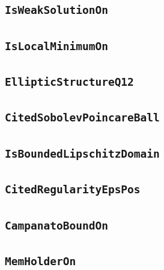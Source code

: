 \documentclass[11pt]{amsart}
\theoremstyle{definition}
\begin{document}
\subsection{\texorpdfstring{\texttt{IsWeakSolutionOn}}{IsWeakSolutionOn}}\label{node:IsWeakSolutionOn}


\subsection{\texorpdfstring{\texttt{IsLocalMinimumOn}}{IsLocalMinimumOn}}\label{node:IsLocalMinimumOn}


\subsection{\texorpdfstring{\texttt{EllipticStructureQ12}}{EllipticStructureQ12}}\label{node:EllipticStructureQ12}


\subsection{\texorpdfstring{\texttt{CitedSobolevPoincareBall}}{CitedSobolevPoincareBall}}\label{node:CitedSobolevPoincareBall}


\subsection{\texorpdfstring{\texttt{IsBoundedLipschitzDomain}}{IsBoundedLipschitzDomain}}\label{node:IsBoundedLipschitzDomain}


\subsection{\texorpdfstring{\texttt{CitedRegularityEpsPos}}{CitedRegularityEpsPos}}\label{node:CitedRegularityEpsPos}


\subsection{\texorpdfstring{\texttt{CampanatoBoundOn}}{CampanatoBoundOn}}\label{node:CampanatoBoundOn}


\subsection{\texorpdfstring{\texttt{MemHolderOn}}{MemHolderOn}}\label{node:MemHolderOn}

\end{document}
